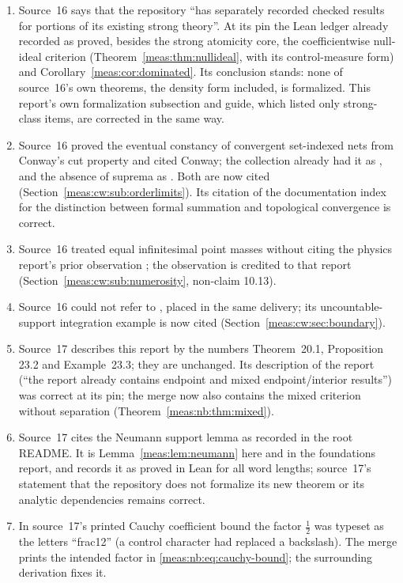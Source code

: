 \documentclass[11pt]{article}
\numberwithin{equation}{section}
\theoremstyle{definition}
\theoremstyle{remark}
\begin{document}
\begin{enumerate}[label=(\arabic*)]
after source~16 was merged and has 106 after source~17 was merged, and
Theorem~\ref{meas:thm:nullideal} keeps the number 19.2.
\item Source~16 says that the repository ``has separately recorded checked results for
portions of its existing strong theory''. At its pin the Lean ledger
 already recorded as proved, besides the strong
atomicity core, the coefficientwise null-ideal criterion
(Theorem~\ref{meas:thm:nullideal}, with its control-measure form) and
Corollary~\ref{meas:cor:dominated}. Its conclusion stands: none of source~16's own
theorems, the density form included, is formalized. This report's own formalization
subsection and guide, which listed only strong-class items, are corrected in the
same way.
\item Source~16 proved the eventual constancy of convergent set-indexed nets from
Conway's cut property and cited Conway; the collection already had it as
, and the absence of suprema as
. Both are now cited
(Section~\ref{meas:cw:sub:orderlimits}). Its citation of the documentation index for
the distinction between formal summation and topological convergence is correct.
\item Source~16 treated equal infinitesimal point masses without citing the physics
report's prior observation ; the observation is credited to
that report (Section~\ref{meas:cw:sub:numerosity}, non-claim 10.13).
\item Source~16 could not refer to , placed in
the same delivery; its uncountable-support integration example is now cited
(Section~\ref{meas:cw:sec:boundary}).
\item Source~17 describes this report by the numbers Theorem~20.1, Proposition 23.2
and Example~23.3; they are unchanged. Its description of the report
(``the report already contains endpoint and mixed endpoint/interior results'') was
correct at its pin; the merge now also contains the mixed criterion without
separation (Theorem~\ref{meas:nb:thm:mixed}).
\item Source~17 cites the Neumann support lemma as recorded in the root README. It is
Lemma~\ref{meas:lem:neumann} here and  in the
foundations report, and  records it as proved in Lean
for all word lengths; source~17's statement that the repository does not formalize
its new theorem or its analytic dependencies remains correct.
\item In source~17's printed Cauchy coefficient bound the factor $\frac12$ was
typeset as the letters ``frac12'' (a control character had replaced a backslash).
The merge prints the intended factor in \eqref{meas:nb:eq:cauchy-bound}; the
surrounding derivation fixes it.
\end{enumerate}
\end{document}
